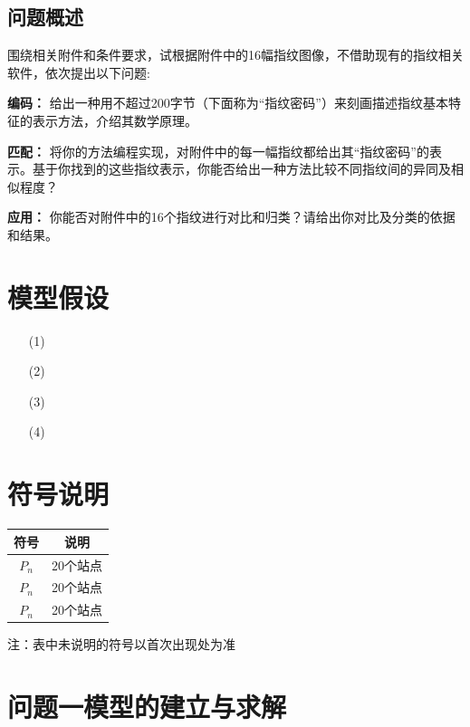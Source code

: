 \documentclass{whutmod}
\begin{document}
		\subsection{问题概述}
		    围绕相关附件和条件要求，试根据附件中的16幅指纹图像，不借助现有的指纹相关软件，依次提出以下问题:
				 
			
			\textbf{编码：} 给出一种用不超过200字节（下面称为“指纹密码”）来刻画描述指纹基本特征的表示方法，介绍其数学原理。
			
			\textbf{匹配：} 将你的方法编程实现，对附件中的每一幅指纹都给出其“指纹密码”的表示。基于你找到的这些指纹表示，你能否给出一种方法比较不同指纹间的异同及相似程度？
			
			\textbf{应用：} 你能否对附件中的16个指纹进行对比和归类？请给出你对比及分类的依据和结果。

	\section{模型假设}
		\begin{itemize}                                             
		\item [(1)] 
		\item [(2)]
		\item [(3)] 
		\item [(4)] 
		\end{itemize}

		
	\section{符号说明}
		\begin{table}[H]
		\centering
		\setlength{\tabcolsep}{12mm}
		\begin{tabular}{cc}
			\toprule[1.5pt]
			\multicolumn{1}{m{5cm}}{\centering 符号} & \multicolumn{1}{m{5cm}}{\centering 说明} \\
			\midrule[1pt]		
			$P_n$  & 20个站点  \\ 
			$P_n$  & 20个站点  \\ 
		   	$P_n$  & 20个站点  \\ 
			\bottomrule[1.5pt]
		\end{tabular}
		\begin{tablenotes}
		\item 注：表中未说明的符号以首次出现处为准
		\end{tablenotes}
		\end{table}

	\section{问题一模型的建立与求解}
\end{document}
